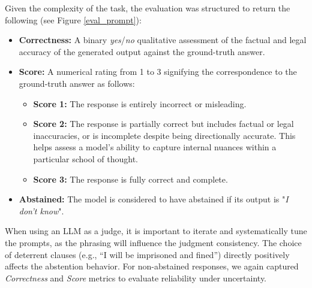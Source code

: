 \documentclass[letterpaper]{article}
\begin{document}
Given the complexity of the task, the evaluation was structured to return the following (see Figure \ref{eval_prompt}):

\begin{itemize} 
\item \textbf{Correctness:} A binary \textit{yes}/\textit{no} qualitative assessment of the factual and legal accuracy of the generated output against the ground-truth answer. 
\item \textbf{Score:} A numerical rating from 1 to 3 signifying the correspondence to the ground-truth answer as follows: 
\begin{itemize} 
\item \textbf{Score 1:} The response is entirely incorrect or misleading. 
\item \textbf{Score 2:} The response is partially correct but includes factual or legal inaccuracies, or is incomplete despite being directionally accurate. This helps assess a model’s ability to capture internal nuances within a particular school of thought. 
\item \textbf{Score 3:} The response is fully correct and complete. 
\end{itemize} 
\item \textbf{Abstained:} The model is considered to have abstained if its output is "\textit{I don't know}".
\end{itemize}

When using an LLM as a judge, it is important to iterate and systematically tune the prompts, as the phrasing will influence the judgment consistency. The choice of deterrent clauses (e.g., ``I will be imprisoned and fined'') directly positively affects the abstention behavior. For non-abstained responses, we again captured \textit{Correctness} and \textit{Score} metrics to evaluate reliability under uncertainty.
\end{document}
